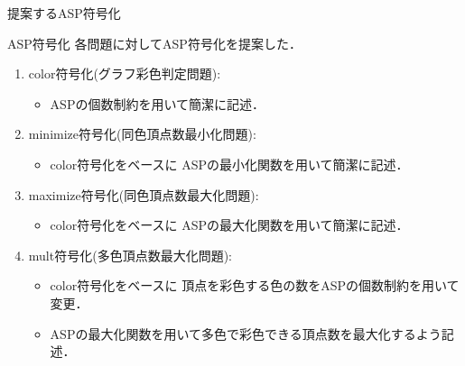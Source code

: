 \documentclass[dvipdfmx,11pt]{beamer}
\begin{document}
\begin{frame}{提案するASP符号化}

 \begin{block}{ASP符号化}
 各問題に対してASP符号化を提案した．

 \begin{enumerate}
  \item \alert{color符号化}(グラフ彩色判定問題):
        \begin{itemize}
         \item ASPの個数制約を用いて簡潔に記述．
        \end{itemize}
  \item \alert{minimize符号化}(同色頂点数最小化問題):
        \begin{itemize}
         \item color符号化をベースに
               ASPの最小化関数を用いて簡潔に記述．
        \end{itemize}
  \item \alert{maximize符号化}(同色頂点数最大化問題):
        \begin{itemize}
         \item color符号化をベースに
               ASPの最大化関数を用いて簡潔に記述．
        \end{itemize}
  \item \alert{mult符号化}(多色頂点数最大化問題):
        \begin{itemize}
         \item color符号化をベースに
               頂点を彩色する色の数をASPの個数制約を用いて変更．
         \item ASPの最大化関数を用いて多色で彩色できる頂点数を最大化するよう記述．
        \end{itemize}
 \end{enumerate}
 \end{block}
\end{frame}

\end{document}
